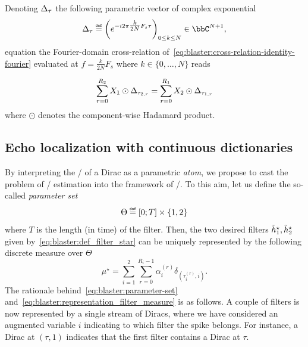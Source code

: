 \mynewline
Denoting $\Delta_{\tau}$ the following parametric vector of complex exponential
\begin{equation}
    \label{eq:blaster:closed-form-TF-dirac-N}
    \paramVec{\tau} \eqdef
    \left(\cste^{-\csti2\pi\tfrac{k}{2N}F_s \tau}\right)_{0 \leq k \leq N}
    \in\bbC^{N+1}
    ,
\end{equation}
equation the Fourier-domain cross-relation of~\cref{eq:blaster:cross-relation-identity-fourier} evaluated at $f = \frac{k}{2N}F_s$ where $k \in \{0,\ldots, N\}$
reads

\begin{equation}
    \label{eq:blaster:cross-relation-approx}
    \sum_{r=0}^{R_2}X_1 \odot \Delta_{\tau_{2,r}}
    =
    \sum_{r=0}^{R_1}X_2 \odot \Delta_{\tau_{1,r}}
\end{equation}
where $\odot$ denotes the component-wise Hadamard product.

\subsection{Echo localization with continuous dictionaries}
By interpreting the \FT/ of a Dirac as a parametric \textit{atom}, we propose to cast the problem of \RIR/ estimation into the framework of \CDdef/.
To this aim, let us define the so-called \emph{parameter set}
\begin{equation}
    \label{eq:blaster:parameter-set}
    \Theta \eqdef \kintervcc{0}{T} \times \kbrace{1, 2}
\end{equation}
where $T$ is the length (in time) of the filter.
Then, the two desired filters  $\tilde{h}_1^\star,\tilde{h}_2^\star$ given by~\cref{eq:blaster:def_filter_star} can be uniquely represented by the following discrete measure over $\Theta$
\begin{equation}
    \label{eq:blaster:representation_filter_measure}
    \mu^\star = \sum_{i=1}^{2} \sum_{r=0}^{R_{i}-1} \alpha_{i}^{(r)} \delta_{(\tau_{i}^{(r)}, i)}.
\end{equation}
The rationale behind~\cref{eq:blaster:parameter-set}  and~\cref{eq:blaster:representation_filter_measure} is as follows.
A couple of filters is now represented by a single stream of Diracs, where we have considered an augmented variable $i$ indicating to which filter the spike belongs.
For instance, a Dirac at $(\tau, 1)$ indicates that the first filter contains a Dirac at $\tau$.

